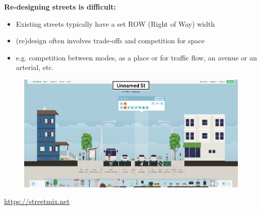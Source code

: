 \documentclass[aspectratio=169]{beamer}
\begin{document}
\begin{frame}
	
	\textbf{Re-designing streets is difficult:}
	
	\begin{itemize}
		\item Existing streets typically have a set ROW (Right of Way) width
		\item (re)design often involves trade-offs and competition for space
		\item e.g. competition between modes, as a place or for traffic flow, an avenue or an arterial, etc.
	\end{itemize}
	

	
	
	
%		
%		
%		
%		
	
	
	\begin{figure}
		\centering
		\includegraphics[width=0.85\linewidth]{images/streetmix.png}
	\end{figure}
	
	\tiny\url{https://streetmix.net}
	
\end{frame}
\end{document}

